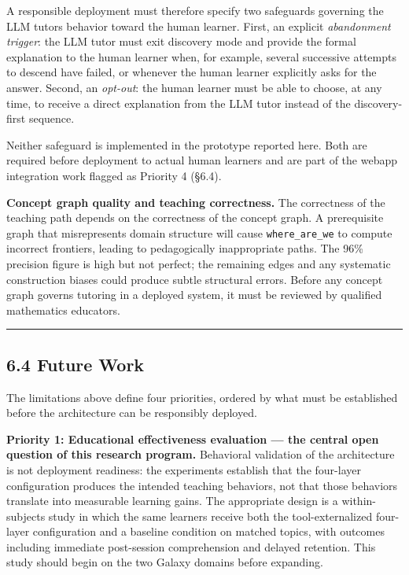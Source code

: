 \documentclass[
]{article}
\begin{document}
A responsible deployment must therefore specify two safeguards governing the LLM tutor\textquotesingle s behavior toward the human learner. First, an explicit \emph{abandonment trigger}: the LLM tutor must exit discovery mode and provide the formal explanation to the human learner when, for example, several successive attempts to descend have failed, or whenever the human learner explicitly asks for the answer. Second, an \emph{opt-out}: the human learner must be able to choose, at any time, to receive a direct explanation from the LLM tutor instead of the discovery-first sequence.

Neither safeguard is implemented in the prototype reported here. Both are required before deployment to actual human learners and are part of the webapp integration work flagged as Priority 4 (§6.4).

\textbf{Concept graph quality and teaching correctness.} The correctness of the teaching path depends on the correctness of the concept graph. A prerequisite graph that misrepresents domain structure will cause \texttt{where\_are\_we} to compute incorrect frontiers, leading to pedagogically inappropriate paths. The 96\% precision figure is high but not perfect; the remaining edges and any systematic construction biases could produce subtle structural errors. Before any concept graph governs tutoring in a deployed system, it must be reviewed by qualified mathematics educators.

\begin{center}\rule{0.5\linewidth}{0.5pt}\end{center}

\subsection{6.4 Future Work}\label{64-future-work}

The limitations above define four priorities, ordered by what must be established before the architecture can be responsibly deployed.

\textbf{Priority 1: Educational effectiveness evaluation --- the central open question of this research program.} Behavioral validation of the architecture is not deployment readiness: the experiments establish that the four-layer configuration produces the intended teaching behaviors, not that those behaviors translate into measurable learning gains. The appropriate design is a within-subjects study in which the same learners receive both the tool-externalized four-layer configuration and a baseline condition on matched topics, with outcomes including immediate post-session comprehension and delayed retention. This study should begin on the two Galaxy domains before expanding.
\end{document}
